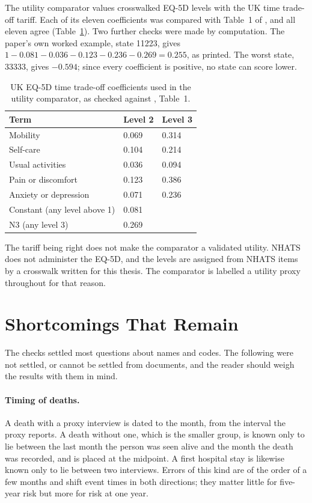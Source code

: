 The utility comparator values crosswalked EQ-5D levels with the UK time
trade-off tariff. Each of its eleven coefficients was compared with Table~1 of
\citet{dolan_1995_che}, and all eleven agree (Table~\ref{tab:G_tariff}). Two
further checks were made by computation. The paper's own worked example, state
11223, gives $1 - 0.081 - 0.036 - 0.123 - 0.236 - 0.269 = 0.255$, as printed.
The worst state, 33333, gives $-0.594$; since every coefficient is positive,
no state can score lower.

\begin{table}[htbp]
\centering
\caption[UK EQ-5D time trade-off coefficients used in the utility comparator]{UK EQ-5D time trade-off coefficients used in the utility comparator, as checked against \citet{dolan_1995_che}, Table~1.}
\label{tab:G_tariff}
\footnotesize
\renewcommand{\arraystretch}{1.15}
\begin{tabular}{p{5.0cm} p{2.0cm} p{2.0cm}}
\toprule
\textbf{Term} & \textbf{Level 2} & \textbf{Level 3} \\
\midrule
Mobility & 0.069 & 0.314 \\
Self-care & 0.104 & 0.214 \\
Usual activities & 0.036 & 0.094 \\
Pain or discomfort & 0.123 & 0.386 \\
Anxiety or depression & 0.071 & 0.236 \\
\midrule
Constant (any level above 1) & \multicolumn{2}{l}{0.081} \\
N3 (any level 3) & \multicolumn{2}{l}{0.269} \\
\bottomrule
\end{tabular}
\end{table}

The tariff being right does not make the comparator a validated utility. NHATS
does not administer the EQ-5D, and the levels are assigned from NHATS items by
a crosswalk written for this thesis. The comparator is labelled a utility
proxy throughout for that reason.

\section{Shortcomings That Remain}
\label{sec:G_limits}

The checks settled most questions about names and codes. The following were
not settled, or cannot be settled from documents, and the reader should weigh
the results with them in mind.

\paragraph{Timing of deaths.} A death with a proxy interview is dated to the
month, from the interval the proxy reports. A death without one, which is the
smaller group, is known only to lie between the last month the person was
seen alive and the month the death was recorded, and is placed at the
midpoint. A first hospital stay is likewise known only to lie between two
interviews. Errors of this kind are of the order of a few months and shift
event times in both directions; they matter little for five-year risk but
more for risk at one year.

